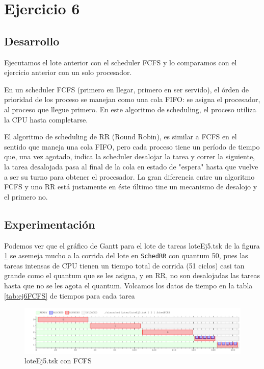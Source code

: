 \section{Ejercicio 6}


\subsection{Desarrollo}
Ejecutamos el lote anterior con el scheduler FCFS
 y lo comparamos con el ejercicio anterior con un solo procesador.\par
En un scheduler FCFS (primero en llegar, primero en ser servido), el órden de prioridad de los proceso se manejan como una cola FIFO: se asigna el procesador, al proceso que llegue primero. En este algoritmo de scheduling, el proceso utiliza la CPU hasta completarse.\par
El algoritmo de scheduling de RR (Round Robin), es similar a FCFS en el sentido que maneja una cola FIFO, pero cada proceso tiene un período de tiempo que, una vez agotado, indica la scheduler desalojar la tarea y correr la siguiente, la tarea desalojada pasa al final de la cola en estado de "espera" hasta que vuelve a ser su turno para obtener el procesador. La gran diferencia entre un algoritmo FCFS y uno RR está justamente en éste último tine un mecanismo de desalojo y el primero no.


\subsection{Experimentación}
Podemos ver que el gráfico de Gantt para el lote de tareas loteEj5.tsk de la figura \ref{fig:ej6FCFS} se asemeja mucho a la corrida del lote en \verb|SchedRR| con quantum 50, pues las tareas intensas de CPU tienen un tiempo total de corrida (51 ciclos) casi tan grande como el quantum que se les asigna, y en RR, no son desalojadas las tareas hasta que no se les agota el quantum.  Volcamos los datos de tiempo en la tabla \ref{tab:ej6FCFS} de tiempos para cada tarea\par
\begin{figure}[H]
  \centering
    \includegraphics[width=1.1\textwidth]{imagenes/Ej6.png}
  \caption{loteEj5.tsk con FCFS}
  \label{fig:ej6FCFS}
\end{figure}


